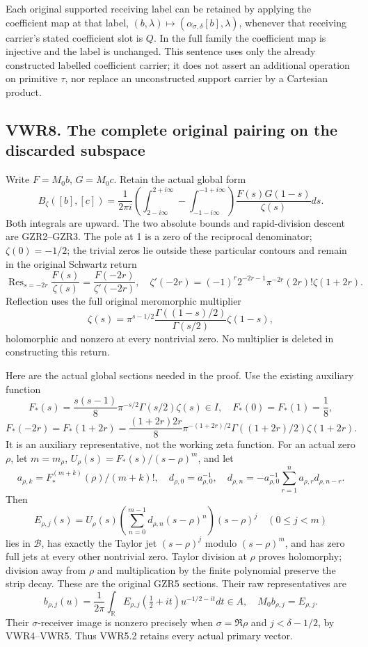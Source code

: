 Each original supported receiving label can be retained by applying the
coefficient map at that label,
\((b,\lambda)\mapsto(\alpha_{\sigma,\delta}[b],\lambda)\), whenever that
receiving carrier's stated coefficient slot is \(Q\). In the full family
the coefficient map is injective and the label is unchanged. This
sentence uses only the already constructed labelled coefficient carrier;
it does not assert an additional operation on primitive \(\tau\), nor
replace an unconstructed support carrier by a Cartesian product.

\subsection{VWR8. The complete original pairing on the discarded
subspace}\label{vwr8.-the-complete-original-pairing-on-the-discarded-subspace}

Write \(F=M_0b\), \(G=M_0c\). Retain the actual global form \[
B_\zeta([b],[c])=\frac1{2\pi i}
\left(\int_{2-i\infty}^{2+i\infty}-\int_{-1-i\infty}^{-1+i\infty}\right)
\frac{F(s)G(1-s)}{\zeta(s)}ds.
\tag{VWR8.1}
\] Both integrals are upward. The two absolute bounds and rapid-division
descent are GZR2--GZR3. The pole at 1 is a zero of the reciprocal
denominator; \(\zeta(0)=-1/2\); the trivial zeros lie outside these
particular contours and remain in the original Schwartz return \[
\operatorname{Res}_{s=-2r}\frac{F(s)}{\zeta(s)}
=\frac{F(-2r)}{\zeta'(-2r)},\quad
\zeta'(-2r)=(-1)^r2^{-2r-1}\pi^{-2r}(2r)!\zeta(1+2r).
\tag{VWR8.2}
\] Reflection uses the full original meromorphic multiplier \[
\zeta(s)=\pi^{s-1/2}\frac{\Gamma((1-s)/2)}{\Gamma(s/2)}\zeta(1-s),
\tag{VWR8.3}
\] holomorphic and nonzero at every nontrivial zero. No multiplier is
deleted in constructing this return.

Here are the actual global sections needed in the proof. Use the
existing auxiliary function \[
F_*(s)=\frac{s(s-1)}8\pi^{-s/2}\Gamma(s/2)\zeta(s)\in I,
\quad F_*(0)=F_*(1)=\frac18,
\] \[
F_*(-2r)=F_*(1+2r)
=\frac{(1+2r)2r}{8}\pi^{-(1+2r)/2}\Gamma((1+2r)/2)\zeta(1+2r).
\tag{VWR8.4}
\] It is an auxiliary representative, not the working zeta function. For
an actual zero \(\rho\), let \(m=m_\rho\),
\(U_\rho(s)=F_*(s)/(s-\rho)^m\), and let \[
a_{\rho,k}=F_*^{(m+k)}(\rho)/(m+k)!,\quad d_{\rho,0}=a_{\rho,0}^{-1},\quad
d_{\rho,n}=-a_{\rho,0}^{-1}\sum_{r=1}^na_{\rho,r}d_{\rho,n-r}.
\] Then \[
E_{\rho,j}(s)=U_\rho(s)\left(\sum_{n=0}^{m-1}d_{\rho,n}(s-\rho)^n\right)(s-\rho)^j
\quad(0\le j<m)
\tag{VWR8.5}
\] lies in \(\mathcal B\), has exactly the Taylor jet \((s-\rho)^j\)
modulo \((s-\rho)^m\), and has zero full jets at every other nontrivial
zero. Taylor division at \(\rho\) proves holomorphy; division away from
\(\rho\) and multiplication by the finite polynomial preserve the strip
decay. These are the original GZR5 sections. Their raw representatives
are \[
b_{\rho,j}(u)=\frac1{2\pi}\int_{\mathbb R}
 E_{\rho,j}(\tfrac12+it)u^{-1/2-it}dt\in A,
\quad M_0b_{\rho,j}=E_{\rho,j}.
\tag{VWR8.6}
\] Their \(\sigma\)-receiver image is nonzero precisely when
\(\sigma=\Re\rho\) and \(j<\delta-1/2\), by VWR4--VWR5. Thus VWR5.2
retains every actual primary vector.

